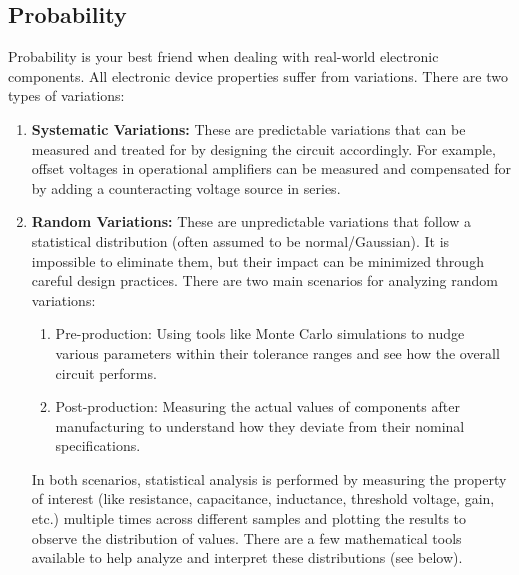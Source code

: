 \subsection{Probability}\label{sec:theory_general_probability}

Probability is your best friend when dealing with real-world
electronic components. All electronic device properties suffer
from variations. There are two types of variations:
\begin{enumerate}
  \item \textbf{Systematic Variations:} These are predictable
    variations that can be measured and treated for by designing
    the circuit accordingly. For example, offset voltages in
    operational amplifiers can be measured and compensated for
    by adding a counteracting voltage source in series.
  \item \textbf{Random Variations:} These are unpredictable
    variations that follow a statistical distribution (often
    assumed to be normal/Gaussian). It is impossible to
    eliminate them, but their impact can be minimized through
    careful design practices. There are two main scenarios for
    analyzing random variations:
    \begin{enumerate}
      \item Pre-production: Using tools like Monte Carlo
        simulations to nudge various parameters within their
        tolerance ranges and see how the overall circuit performs.
      \item Post-production: Measuring the actual values of
        components after manufacturing to understand how they
        deviate from their nominal specifications.
    \end{enumerate}
    In both scenarios, statistical analysis is performed by
    measuring the property of interest (like resistance,
    capacitance, inductance, threshold voltage, gain, etc.)
    multiple times across different samples and plotting the
    results to observe the distribution of values. There are
    a few mathematical tools available to help analyze and
    interpret these distributions (see below).
\end{enumerate}

